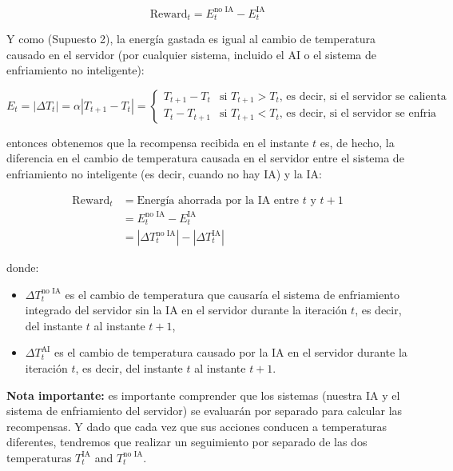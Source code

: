 \documentclass[]{book}
\providecommand{\tightlist}{%
  \setlength{\itemsep}{0pt}\setlength{\parskip}{0pt}}
\begin{document}
\[\textrm{Reward}_t = E_t^{\textrm{no IA}} - E_t^{\textrm{IA}}\]

Y como (Supuesto 2), la energía gastada es igual al cambio de temperatura causado en el servidor (por cualquier sistema, incluido el AI o el sistema de enfriamiento no inteligente):

\begin{equation*}
E_t = |\Delta T_t| = \alpha |T_{t+1} - T_t| =
\begin{cases}
T_{t+1} - T_t & \textrm{si $T_{t+1} > T_t$, es decir, si el servidor se calienta} \\
T_t - T_{t+1} & \textrm{si $T_{t+1} < T_t$, es decir, si el servidor se enfria}
\end{cases}
\end{equation*}

entonces obtenemos que la recompensa recibida en el instante \(t\) es, de hecho, la diferencia en el cambio de temperatura causada en el servidor entre el sistema de enfriamiento no inteligente (es decir, cuando no hay IA) y la IA:

\begin{align*}
    \textrm{Reward}_t
    & = \textrm{Energía ahorrada por la IA entre $t$ y $t+1$} \\
    & = E_t^{\textrm{no IA}} - E_t^{\textrm{IA}} \\
    & = |\Delta T_t^{\textrm{no IA}}| - |\Delta T_t^{\textrm{IA}}|
\end{align*}

donde:

\begin{itemize}
\tightlist
\item
  \(\Delta T_t^{\textrm{no IA}}\) es el cambio de temperatura que causaría el sistema de enfriamiento integrado del servidor sin la IA en el servidor durante la iteración \(t\), es decir, del instante \(t\) al instante \(t + 1\),
\item
  \(\Delta T_t^{\textrm{AI}}\) es el cambio de temperatura causado por la IA en el servidor durante la iteración \(t\), es decir, del instante \(t\) al instante \(t + 1\).
\end{itemize}

\textbf{Nota importante:} es importante comprender que los sistemas (nuestra IA y el sistema de enfriamiento del servidor) se evaluarán por separado para calcular las recompensas. Y dado que cada vez que sus acciones conducen a temperaturas diferentes, tendremos que realizar un seguimiento por separado de las dos temperaturas \(T_t^{\textrm{IA}}\) and \(T_t^{\textrm{no IA}}\).
\end{document}
